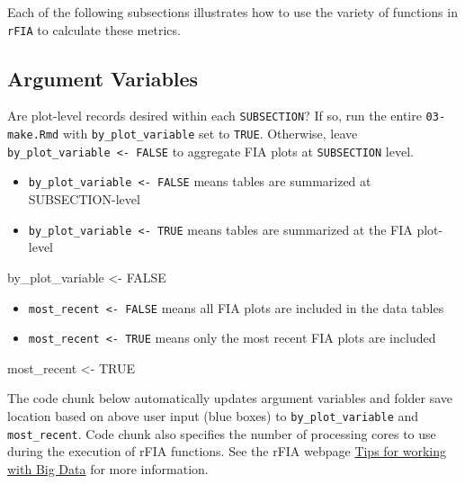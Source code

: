 \documentclass[
]{book}
\newenvironment{Shaded}{\begin{snugshade}}{\end{snugshade}}
\newcommand{\ConstantTok}[1]{\textcolor[rgb]{0.56,0.35,0.01}{#1}}
\newcommand{\NormalTok}[1]{#1}
\newcommand{\OtherTok}[1]{\textcolor[rgb]{0.56,0.35,0.01}{#1}}
\providecommand{\tightlist}{%
  \setlength{\itemsep}{0pt}\setlength{\parskip}{0pt}}
\begin{document}
Each of the following subsections illustrates how to use the variety of functions in \texttt{rFIA} to calculate these metrics.

\hypertarget{argument-variables}{%
\subsection{Argument Variables}\label{argument-variables}}

Are plot-level records desired within each \texttt{SUBSECTION}? If so, run the entire \texttt{03-make.Rmd} with \texttt{by\_plot\_variable} set to \texttt{TRUE}. Otherwise, leave \texttt{by\_plot\_variable\ \textless{}-\ FALSE} to aggregate FIA plots at \texttt{SUBSECTION} level.

\begin{itemize}
\tightlist
\item
  \texttt{by\_plot\_variable\ \textless{}-\ FALSE} means tables are summarized at SUBSECTION-level
\item
  \texttt{by\_plot\_variable\ \textless{}-\ TRUE} means tables are summarized at the FIA plot-level
\end{itemize}

\begin{Shaded}
\begin{Highlighting}[]
\NormalTok{by\_plot\_variable }\OtherTok{\textless{}{-}} \ConstantTok{FALSE}
\end{Highlighting}
\end{Shaded}

\begin{itemize}
\tightlist
\item
  \texttt{most\_recent\ \textless{}-\ FALSE} means all FIA plots are included in the data tables
\item
  \texttt{most\_recent\ \textless{}-\ TRUE} means only the most recent FIA plots are included
\end{itemize}

\begin{Shaded}
\begin{Highlighting}[]
\NormalTok{most\_recent }\OtherTok{\textless{}{-}} \ConstantTok{TRUE}
\end{Highlighting}
\end{Shaded}

The code chunk below automatically updates argument variables and folder save location based on above user input (blue boxes) to \texttt{by\_plot\_variable} and \texttt{most\_recent}. Code chunk also specifies the number of processing cores to use during the execution of rFIA functions. See the rFIA webpage \href{https://rfia.netlify.app/tutorial/bigdata/}{Tips for working with Big Data} for more information.
\end{document}
